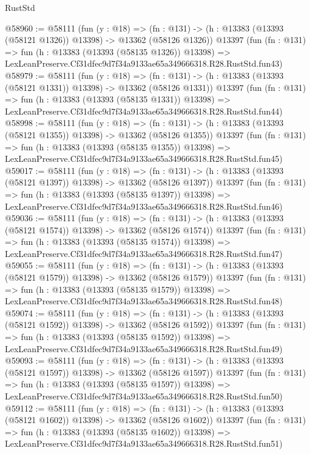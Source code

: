 \begin{lexlean}{RustStd}
\begin{coremodule}
@58960 := @58111
    (fun (y : @18) =>
    (fn : @131) -> (h : @13383 (@13393 (@58121 @1326)) @13398) -> @13362 (@58126 @1326))
    @13397
    (fun (fn : @131) =>
    fun (h : @13383 (@13393 (@58135 @1326)) @13398) =>
    LexLeanPreserve.Cf31dfec9d7f34a9133ae65a349666318.R28.RustStd.fun43)
@58979 := @58111
    (fun (y : @18) =>
    (fn : @131) -> (h : @13383 (@13393 (@58121 @1331)) @13398) -> @13362 (@58126 @1331))
    @13397
    (fun (fn : @131) =>
    fun (h : @13383 (@13393 (@58135 @1331)) @13398) =>
    LexLeanPreserve.Cf31dfec9d7f34a9133ae65a349666318.R28.RustStd.fun44)
@58998 := @58111
    (fun (y : @18) =>
    (fn : @131) -> (h : @13383 (@13393 (@58121 @1355)) @13398) -> @13362 (@58126 @1355))
    @13397
    (fun (fn : @131) =>
    fun (h : @13383 (@13393 (@58135 @1355)) @13398) =>
    LexLeanPreserve.Cf31dfec9d7f34a9133ae65a349666318.R28.RustStd.fun45)
@59017 := @58111
    (fun (y : @18) =>
    (fn : @131) -> (h : @13383 (@13393 (@58121 @1397)) @13398) -> @13362 (@58126 @1397))
    @13397
    (fun (fn : @131) =>
    fun (h : @13383 (@13393 (@58135 @1397)) @13398) =>
    LexLeanPreserve.Cf31dfec9d7f34a9133ae65a349666318.R28.RustStd.fun46)
@59036 := @58111
    (fun (y : @18) =>
    (fn : @131) -> (h : @13383 (@13393 (@58121 @1574)) @13398) -> @13362 (@58126 @1574))
    @13397
    (fun (fn : @131) =>
    fun (h : @13383 (@13393 (@58135 @1574)) @13398) =>
    LexLeanPreserve.Cf31dfec9d7f34a9133ae65a349666318.R28.RustStd.fun47)
@59055 := @58111
    (fun (y : @18) =>
    (fn : @131) -> (h : @13383 (@13393 (@58121 @1579)) @13398) -> @13362 (@58126 @1579))
    @13397
    (fun (fn : @131) =>
    fun (h : @13383 (@13393 (@58135 @1579)) @13398) =>
    LexLeanPreserve.Cf31dfec9d7f34a9133ae65a349666318.R28.RustStd.fun48)
@59074 := @58111
    (fun (y : @18) =>
    (fn : @131) -> (h : @13383 (@13393 (@58121 @1592)) @13398) -> @13362 (@58126 @1592))
    @13397
    (fun (fn : @131) =>
    fun (h : @13383 (@13393 (@58135 @1592)) @13398) =>
    LexLeanPreserve.Cf31dfec9d7f34a9133ae65a349666318.R28.RustStd.fun49)
@59093 := @58111
    (fun (y : @18) =>
    (fn : @131) -> (h : @13383 (@13393 (@58121 @1597)) @13398) -> @13362 (@58126 @1597))
    @13397
    (fun (fn : @131) =>
    fun (h : @13383 (@13393 (@58135 @1597)) @13398) =>
    LexLeanPreserve.Cf31dfec9d7f34a9133ae65a349666318.R28.RustStd.fun50)
@59112 := @58111
    (fun (y : @18) =>
    (fn : @131) -> (h : @13383 (@13393 (@58121 @1602)) @13398) -> @13362 (@58126 @1602))
    @13397
    (fun (fn : @131) =>
    fun (h : @13383 (@13393 (@58135 @1602)) @13398) =>
    LexLeanPreserve.Cf31dfec9d7f34a9133ae65a349666318.R28.RustStd.fun51)

\end{coremodule}
\end{lexlean}
